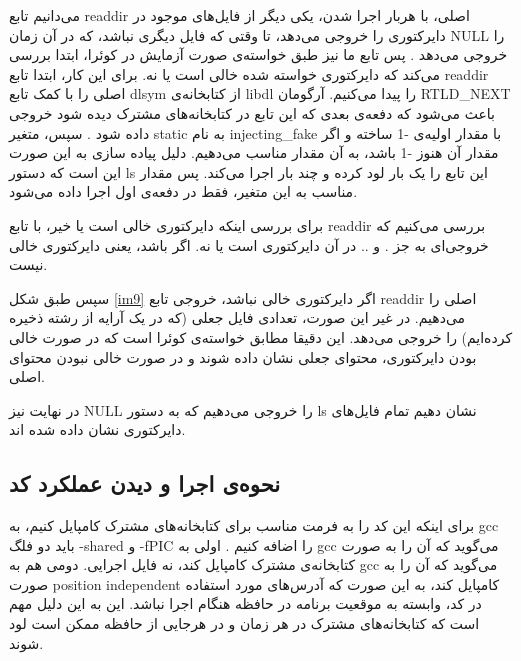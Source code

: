 \documentclass[12pt]{article}
\begin{document}
        می‌دانیم تابع
        \textenglish{readdir}
        اصلی، با هربار اجرا شدن، یکی دیگر از فایل‌های موجود در دایرکتوری را خروجی می‌دهد، تا وقتی که فایل دیگری نباشد، که در آن زمان
        \textenglish{NULL}
        را خروجی می‌دهد
        \cite{opengroup-readdir}.
        پس تابع ما نیز طبق خواسته‌ی صورت آزمایش در کوئرا، ابتدا بررسی می‌کند که دایرکتوری خواسته شده خالی است یا نه. برای این کار، ابتدا تابع 
        \textenglish{readdir}
        اصلی را با کمک تابع
        \textenglish{dlsym}
        از کتابخانه‌ی
        \textenglish{libdl}
        را پیدا می‌کنیم. آرگومان
        \textenglish{RTLD\_NEXT}
        باعث می‌شود که دفعه‌ی بعدی که این تابع در کتابخانه‌های مشترک دیده شود خروجی داده شود
        \cite{opengroup-dlsym}.
        سپس، متغیر 
        \textenglish{static}
        به نام
        \textenglish{injecting\_fake}
        با مقدار اولیه‌ی 
        \textenglish{-1}
        ساخته و اگر مقدار آن هنوز 
        \textenglish{-1}
        باشد، به آن مقدار مناسب می‌دهیم. دلیل پیاده سازی به این صورت این است که 
        دستور
        \textenglish{ls}
        این تابع را یک بار لود کرده و چند بار اجرا می‌کند. 
        پس مقدار مناسب به این متغیر، فقط در دفعه‌ی اول اجرا داده می‌شود. 

        برای بررسی اینکه دایرکتوری خالی است یا خیر، با تابع
        \textenglish{readdir}
        بررسی می‌کنیم که خروجی‌ای به جز
        \textenglish{.}
        و
        \textenglish{..}
        در آن دایرکتوری است یا نه.
        اگر باشد، یعنی دایرکتوری خالی نیست.

        سپس طبق شکل
        \ref{im9}
        اگر دایرکتوری خالی نباشد، خروجی‌ تابع
        \textenglish{readdir}
        اصلی را می‌دهیم. در غیر این صورت، تعدادی فایل جعلی (که در یک آرایه از رشته ذخیره کرده‌ایم) را خروجی می‌دهد. این دقیقا مطابق خواسته‌ی کوئرا است که در صورت خالی بودن دایرکتوری، محتوای جعلی نشان داده شوند و در صورت خالی نبودن محتوای اصلی.

        در نهایت نیز
        \textenglish{NULL}
        را خروجی می‌دهیم که به دستور
        \textenglish{ls}
        نشان دهیم تمام فایل‌های دایرکتوری نشان داده شده اند.

        \subsection{نحوه‌ی اجرا و دیدن عملکرد کد}
        برای اینکه این کد را به فرمت مناسب برای کتابخانه‌های مشترک کامپایل کنیم، به 
        \textenglish{gcc}
        باید دو فلگ
        \textenglish{-shared}
        و 
        \textenglish{-fPIC}
        را اضافه کنیم
        \cite{geeksforgeeks-shared-libraries}.
        اولی به 
        \textenglish{gcc}
        می‌گوید که آن را به صورت کتابخانه‌ی مشترک کامپایل کند، نه فایل اجرایی. دومی هم به
        \textenglish{gcc}
        می‌گوید که آن را به صورت
        \textenglish{position independent}
        کامپایل کند، به این صورت که آدرس‌های مورد استفاده در کد، وابسته به موقعیت برنامه در حافظه هنگام اجرا نباشد. این به این دلیل مهم است که کتابخانه‌های مشترک در هر زمان و در هرجایی از حافظه ممکن است لود شوند.
\end{document}
